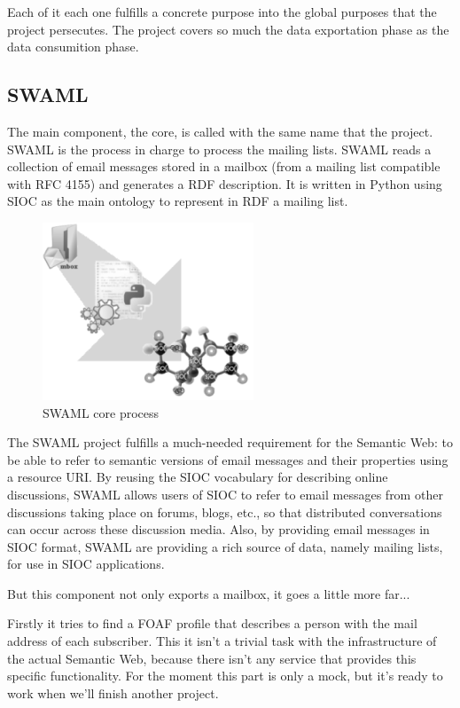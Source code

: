 \documentclass{llncs}
\begin{document}
Each of it each one fulfills a concrete purpose into the global purposes that 
the project persecutes. The project covers so much the data exportation phase 
as the data consumition phase.

\subsection{SWAML}

The main component, the core, is called with the same name that the project. SWAML is
the process in charge to process the mailing lists. SWAML reads a collection of email 
messages stored in a mailbox (from a mailing list compatible with RFC 4155) and generates 
a RDF description. It is written in Python using SIOC as the main ontology to represent 
in RDF a mailing list.

\begin{figure}[ht]
 \centering
 \includegraphics[bb=0 0 238 200]{images/swaml-process.png}
 \caption{SWAML core process}
\end{figure}

The SWAML project fulfills a much-needed requirement for the Semantic Web: to be able 
to refer to semantic versions of email messages and their properties using a resource 
URI. By reusing the SIOC vocabulary for describing online discussions, SWAML allows 
users of SIOC to refer to email messages from other discussions taking place on forums, 
blogs, etc., so that distributed conversations can occur across these discussion media. 
Also, by providing email messages in SIOC format, SWAML are providing a rich source of 
data, namely mailing lists, for use in SIOC applications.

But this component not only exports a mailbox, it goes a little more far...

Firstly it tries to find a FOAF profile that describes a person with the mail address 
of each subscriber. This it isn't a trivial task with the infrastructure of the actual 
Semantic Web, because there isn't any service that provides this specific functionality.
For the moment this part is only a mock, but it's ready to work when we'll finish another 
project.
\end{document}
